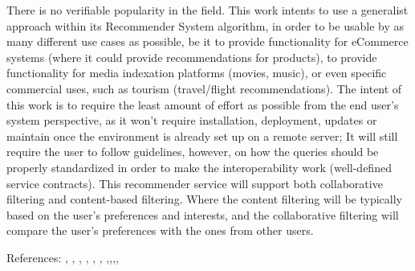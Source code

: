 There is no verifiable popularity in the field. This work intents to use a generalist approach within its Recommender System algorithm, in order to be usable by as many different use cases as possible, be it to provide functionality for eCommerce systems (where it could provide recommendations for products), to provide functionality for media indexation platforms (movies, music), or even specific commercial uses, such as tourism (travel/flight recommendations). The intent of this work is to require the least amount of effort as possible from the end user’s system perspective, as it won’t require installation, deployment, updates or maintain once the environment is already set up on a remote server; It will still require the user to follow guidelines, however, on how the queries should be properly standardized in order to make the interoperability work (well-defined service contracts). This recommender service will support both collaborative filtering and content-based filtering. Where the content filtering will be typically based on the user's preferences and interests, and the collaborative filtering will compare the user’s preferences with the ones from other users.

References: , , , , , , ,,\cite{Jain2019},\cite{Garcia2018},